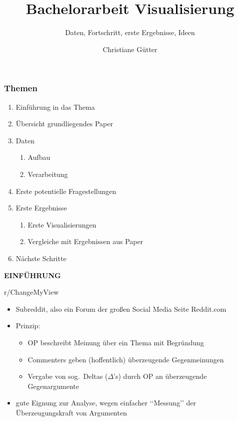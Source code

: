 \documentclass[compress,12pt]{beamer}
\title{Bachelorarbeit Visualisierung}
\subtitle{Daten, Fortschritt, erste Ergebnisse, Ideen}
\date{}
\author{Christiane Gütter}
\institute{Bauhaus Universität Weimar}
\begin{document}
    \frame[plain]{\titlepage}

    \begin{frame}[plain]
        \frametitle{Themen}
        \begin{enumerate}
            \item Einführung in das Thema
            \item Übersicht grundliegendes Paper
            \item Daten
            \begin{enumerate}
                \item Aufbau
                \item Verarbeitung
            \end{enumerate}
            \item Erste potentielle Fragestellungen
            \item Erste Ergebnisse
            \begin{enumerate}
                \item Erste Visualisierungen
                \item Vergleiche mit Ergebnissen aus Paper
            \end{enumerate}
            \item Nächste Schritte
        \end{enumerate}
    \end{frame}


    \begin{frame}
        \centering
        \textbf{EINFÜHRUNG}
    \end{frame}

    \begin{frame}{r/ChangeMyView}
        \begin{itemize}
            \item Subreddit, also ein Forum der großen Social Media Seite Reddit.com
            \item Prinzip:
            \begin{itemize}
                \item OP beschreibt Meinung über ein Thema mit Begründung
                \item Commenters geben (hoffentlich) überzeugende Gegenmeinungen
                \item Vergabe von sog.\ Deltas ($\Delta$\rq{}s) durch OP an überzeugende Gegenargumente
            \end{itemize}
            \item gute Eignung zur Analyse, wegen einfacher \lq\lq{}Messung\rq\rq{} der Überzeugungskraft von Argumenten
        \end{itemize}
    \end{frame}
\end{document}
